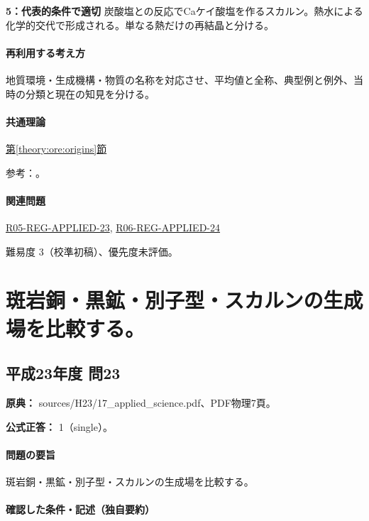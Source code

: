 \noindent\textbf{5：代表的条件で適切} 炭酸塩との反応でCaケイ酸塩を作るスカルン。熱水による化学的交代で形成される。単なる熱だけの再結晶と分ける。\par

\paragraph{再利用する考え方} 地質環境・生成機構・物質の名称を対応させ、平均値と全称、典型例と例外、当時の分類と現在の知見を分ける。

\paragraph{共通理論} \hyperref[theory:ore:origins]{第\ref*{theory:ore:origins}節}

\par 参考：\cite{ore50_kuroko_ref,ore50_porphyry_ref,ore50_skarn_ref,ore50_magmatic_ref,ore50_besshi_ref,ore50_besshi_ref}。

\paragraph{関連問題} \hyperref[q:r05-reg-applied-23]{R05-REG-APPLIED-23}, \hyperref[q:r06-reg-applied-24]{R06-REG-APPLIED-24}

\par 難易度 3（校準初稿）、優先度未評価。

\section{斑岩銅・黒鉱・別子型・スカルンの生成場を比較する。}

\subsection{平成23年度 問23}
\label{q:h23-reg-applied-23}

\noindent\textbf{原典：} sources/H23/17\_applied\_science.pdf、PDF物理7頁。

\textbf{公式正答：} 1（single）。

\paragraph{問題の要旨} 斑岩銅・黒鉱・別子型・スカルンの生成場を比較する。

\paragraph{確認した条件・記述（独自要約）}\mbox{}\par

